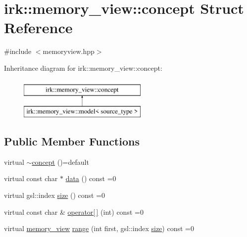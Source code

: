 \hypertarget{structirk_1_1memory__view_1_1concept}{}\section{irk\+:\+:memory\+\_\+view\+:\+:concept Struct Reference}
\label{structirk_1_1memory__view_1_1concept}


{\ttfamily \#include $<$memoryview.\+hpp$>$}

Inheritance diagram for irk\+:\+:memory\+\_\+view\+:\+:concept\+:\begin{figure}[H]
\begin{center}
\leavevmode
\includegraphics[height=2.000000cm]{structirk_1_1memory__view_1_1concept}
\end{center}
\end{figure}
\subsection*{Public Member Functions}
\begin{DoxyCompactItemize}
\item 
virtual \mbox{\hyperlink{structirk_1_1memory__view_1_1concept_a970a71a31247472092552d2358968116}{$\sim$concept}} ()=default
\item 
virtual const char $\ast$ \mbox{\hyperlink{structirk_1_1memory__view_1_1concept_a9e124ac4016556f7cf7fd864dcc43a7c}{data}} () const =0
\item 
virtual gsl\+::index \mbox{\hyperlink{structirk_1_1memory__view_1_1concept_ae280e124e776a61562f6a97b2fa7d655}{size}} () const =0
\item 
virtual const char \& \mbox{\hyperlink{structirk_1_1memory__view_1_1concept_a423a9cc01cfa22943f6667e7e9359c19}{operator\mbox{[}$\,$\mbox{]}}} (int) const =0
\item 
virtual \mbox{\hyperlink{classirk_1_1memory__view}{memory\+\_\+view}} \mbox{\hyperlink{structirk_1_1memory__view_1_1concept_a65c761925c104cfd049dc5de3d800f37}{range}} (int first, gsl\+::index \mbox{\hyperlink{structirk_1_1memory__view_1_1concept_ae280e124e776a61562f6a97b2fa7d655}{size}}) const =0
\end{DoxyCompactItemize}


